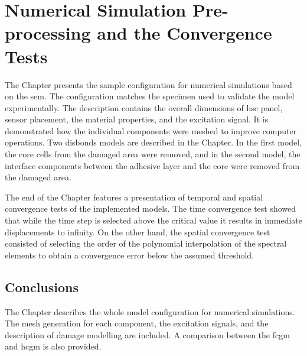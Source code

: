 
\chapter{Numerical Simulation Pre-processing and the Convergence Tests}
\label{ch:simulation}

The Chapter presents the sample configuration for numerical simulations based on the \ac{sem}.
The configuration matches the specimen used to validate the model experimentally.
The description contains the overall dimensions of \ac{hsc} panel, sensor placement, the material properties, and the excitation signal.
It is demonstrated how the individual components were meshed to improve computer operations.
Two disbonds models are described in the Chapter.
In the first model, the core cells from the damaged area were removed, and in the second model, the interface components between the adhesive layer and the core were removed from the damaged area.

The end of the Chapter features a presentation of temporal and spatial convergence tests of the implemented models.
The time convergence test showed that while the time step is selected above the critical value it results in immediate displacements to infinity.
On the other hand, the spatial convergence test consisted of selecting the order of the polynomial interpolation of the spectral elements to obtain a convergence error below the assumed threshold.








\section{Conclusions}
\label{sec:conclusionsSimul}

The Chapter describes the whole model configuration for numerical simulations.
The mesh generation for each component, the excitation signals, and the description of damage modelling are included.
A comparison between the \ac{fcgm} and \ac{hcgm} is also provided.

